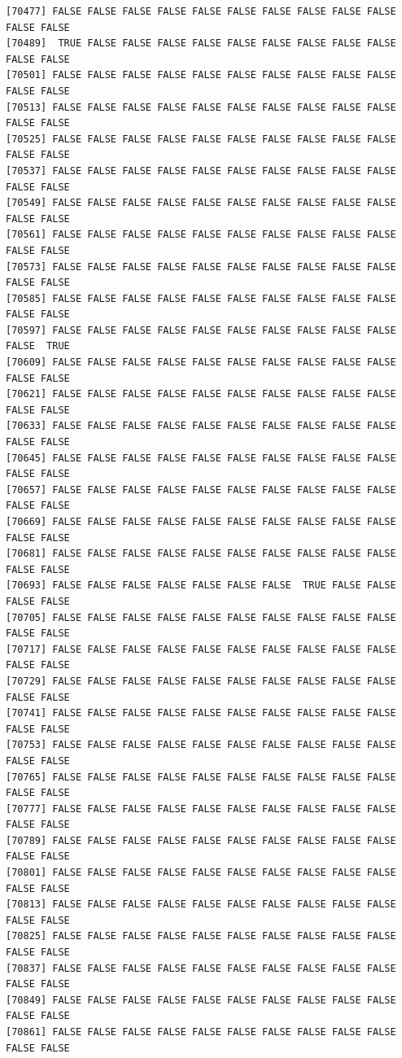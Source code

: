 \documentclass[
  a4paper,
  DIV=11,
  numbers=noendperiod]{scrartcl}
\begin{document}
\begin{verbatim}
[70477] FALSE FALSE FALSE FALSE FALSE FALSE FALSE FALSE FALSE FALSE FALSE FALSE
[70489]  TRUE FALSE FALSE FALSE FALSE FALSE FALSE FALSE FALSE FALSE FALSE FALSE
[70501] FALSE FALSE FALSE FALSE FALSE FALSE FALSE FALSE FALSE FALSE FALSE FALSE
[70513] FALSE FALSE FALSE FALSE FALSE FALSE FALSE FALSE FALSE FALSE FALSE FALSE
[70525] FALSE FALSE FALSE FALSE FALSE FALSE FALSE FALSE FALSE FALSE FALSE FALSE
[70537] FALSE FALSE FALSE FALSE FALSE FALSE FALSE FALSE FALSE FALSE FALSE FALSE
[70549] FALSE FALSE FALSE FALSE FALSE FALSE FALSE FALSE FALSE FALSE FALSE FALSE
[70561] FALSE FALSE FALSE FALSE FALSE FALSE FALSE FALSE FALSE FALSE FALSE FALSE
[70573] FALSE FALSE FALSE FALSE FALSE FALSE FALSE FALSE FALSE FALSE FALSE FALSE
[70585] FALSE FALSE FALSE FALSE FALSE FALSE FALSE FALSE FALSE FALSE FALSE FALSE
[70597] FALSE FALSE FALSE FALSE FALSE FALSE FALSE FALSE FALSE FALSE FALSE  TRUE
[70609] FALSE FALSE FALSE FALSE FALSE FALSE FALSE FALSE FALSE FALSE FALSE FALSE
[70621] FALSE FALSE FALSE FALSE FALSE FALSE FALSE FALSE FALSE FALSE FALSE FALSE
[70633] FALSE FALSE FALSE FALSE FALSE FALSE FALSE FALSE FALSE FALSE FALSE FALSE
[70645] FALSE FALSE FALSE FALSE FALSE FALSE FALSE FALSE FALSE FALSE FALSE FALSE
[70657] FALSE FALSE FALSE FALSE FALSE FALSE FALSE FALSE FALSE FALSE FALSE FALSE
[70669] FALSE FALSE FALSE FALSE FALSE FALSE FALSE FALSE FALSE FALSE FALSE FALSE
[70681] FALSE FALSE FALSE FALSE FALSE FALSE FALSE FALSE FALSE FALSE FALSE FALSE
[70693] FALSE FALSE FALSE FALSE FALSE FALSE FALSE  TRUE FALSE FALSE FALSE FALSE
[70705] FALSE FALSE FALSE FALSE FALSE FALSE FALSE FALSE FALSE FALSE FALSE FALSE
[70717] FALSE FALSE FALSE FALSE FALSE FALSE FALSE FALSE FALSE FALSE FALSE FALSE
[70729] FALSE FALSE FALSE FALSE FALSE FALSE FALSE FALSE FALSE FALSE FALSE FALSE
[70741] FALSE FALSE FALSE FALSE FALSE FALSE FALSE FALSE FALSE FALSE FALSE FALSE
[70753] FALSE FALSE FALSE FALSE FALSE FALSE FALSE FALSE FALSE FALSE FALSE FALSE
[70765] FALSE FALSE FALSE FALSE FALSE FALSE FALSE FALSE FALSE FALSE FALSE FALSE
[70777] FALSE FALSE FALSE FALSE FALSE FALSE FALSE FALSE FALSE FALSE FALSE FALSE
[70789] FALSE FALSE FALSE FALSE FALSE FALSE FALSE FALSE FALSE FALSE FALSE FALSE
[70801] FALSE FALSE FALSE FALSE FALSE FALSE FALSE FALSE FALSE FALSE FALSE FALSE
[70813] FALSE FALSE FALSE FALSE FALSE FALSE FALSE FALSE FALSE FALSE FALSE FALSE
[70825] FALSE FALSE FALSE FALSE FALSE FALSE FALSE FALSE FALSE FALSE FALSE FALSE
[70837] FALSE FALSE FALSE FALSE FALSE FALSE FALSE FALSE FALSE FALSE FALSE FALSE
[70849] FALSE FALSE FALSE FALSE FALSE FALSE FALSE FALSE FALSE FALSE FALSE FALSE
[70861] FALSE FALSE FALSE FALSE FALSE FALSE FALSE FALSE FALSE FALSE FALSE FALSE

\end{verbatim}
\end{document}

